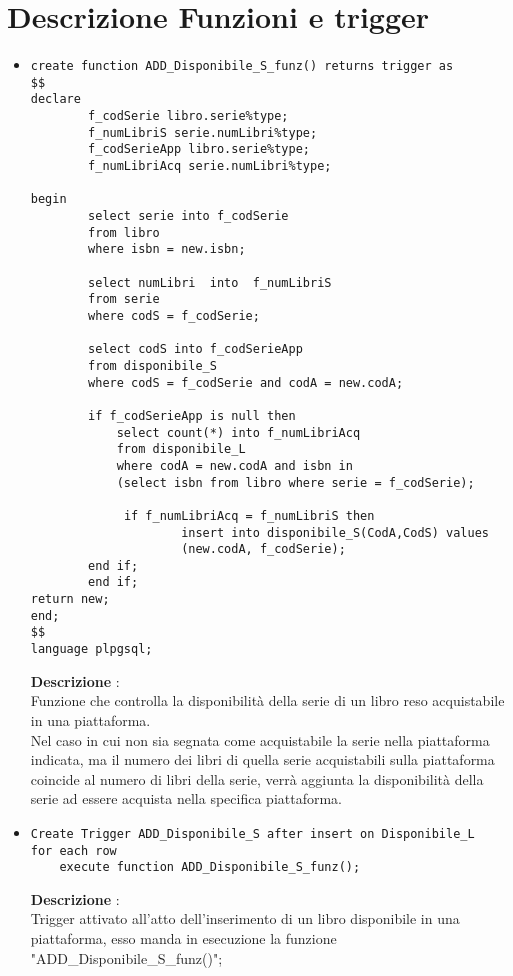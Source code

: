 
\chapter {Descrizione Funzioni e trigger}

\begin{itemize}

\item\begin{verbatim} 
create function ADD_Disponibile_S_funz() returns trigger as
$$
declare
        f_codSerie libro.serie%type;
        f_numLibriS serie.numLibri%type;
        f_codSerieApp libro.serie%type;
        f_numLibriAcq serie.numLibri%type;

begin
        select serie into f_codSerie
        from libro 
        where isbn = new.isbn;

        select numLibri  into  f_numLibriS
        from serie 
        where codS = f_codSerie;

        select codS into f_codSerieApp       
        from disponibile_S
        where codS = f_codSerie and codA = new.codA;

        if f_codSerieApp is null then 
            select count(*) into f_numLibriAcq
            from disponibile_L
            where codA = new.codA and isbn in 
            (select isbn from libro where serie = f_codSerie);

             if f_numLibriAcq = f_numLibriS then
                     insert into disponibile_S(CodA,CodS) values 
                     (new.codA, f_codSerie);
        end if;
        end if;
return new;
end;
$$   
language plpgsql;
\end{verbatim} 
{\bf Descrizione} :\\ 
Funzione che controlla la disponibilità della serie di un libro reso acquistabile in una piattaforma.\\
Nel caso in cui non sia segnata come acquistabile la serie nella piattaforma indicata, ma il numero dei libri di quella serie acquistabili sulla piattaforma coincide al numero di libri della serie, verrà aggiunta la disponibilità della serie ad essere acquista nella specifica piattaforma.

\item\begin{verbatim}
Create Trigger ADD_Disponibile_S after insert on Disponibile_L
for each row
    execute function ADD_Disponibile_S_funz();
\end{verbatim}
{\bf Descrizione} : \\
Trigger  attivato all'atto dell'inserimento di un libro disponibile in una piattaforma, esso manda in esecuzione la funzione "ADD\_Disponibile\_S\_funz()";


\end{itemize}
